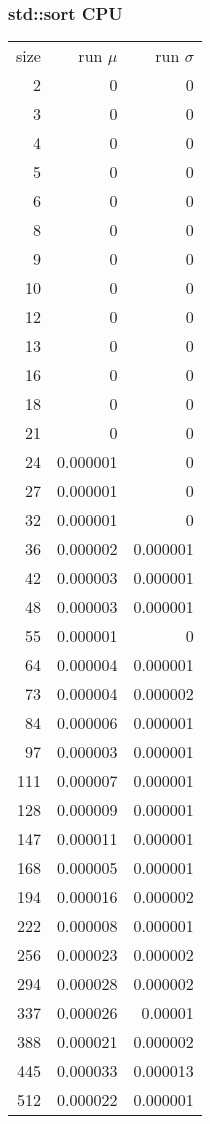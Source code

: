 \subsubsection{std::sort CPU}

\begin{longtable}{r r r}
size & run $\mu$ & run $\sigma$ \\
2 & 0 & 0 \\
3 & 0 & 0 \\
4 & 0 & 0 \\
5 & 0 & 0 \\
6 & 0 & 0 \\
8 & 0 & 0 \\
9 & 0 & 0 \\
10 & 0 & 0 \\
12 & 0 & 0 \\
13 & 0 & 0 \\
16 & 0 & 0 \\
18 & 0 & 0 \\
21 & 0 & 0 \\
24 & 0.000001 & 0 \\
27 & 0.000001 & 0 \\
32 & 0.000001 & 0 \\
36 & 0.000002 & 0.000001 \\
42 & 0.000003 & 0.000001 \\
48 & 0.000003 & 0.000001 \\
55 & 0.000001 & 0 \\
64 & 0.000004 & 0.000001 \\
73 & 0.000004 & 0.000002 \\
84 & 0.000006 & 0.000001 \\
97 & 0.000003 & 0.000001 \\
111 & 0.000007 & 0.000001 \\
128 & 0.000009 & 0.000001 \\
147 & 0.000011 & 0.000001 \\
168 & 0.000005 & 0.000001 \\
194 & 0.000016 & 0.000002 \\
222 & 0.000008 & 0.000001 \\
256 & 0.000023 & 0.000002 \\
294 & 0.000028 & 0.000002 \\
337 & 0.000026 & 0.00001 \\
388 & 0.000021 & 0.000002 \\
445 & 0.000033 & 0.000013 \\
512 & 0.000022 & 0.000001 \\

\end{longtable}
